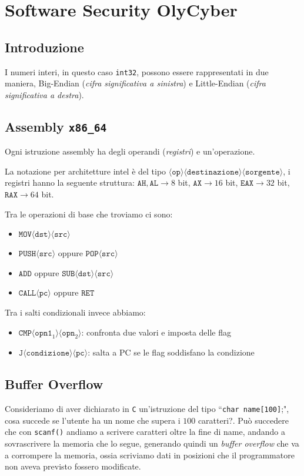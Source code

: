 \chapter{Software Security OlyCyber}
\section{Introduzione}
I numeri interi, in questo caso \texttt{int32}, possono essere rappresentati
in due maniera, Big-Endian (\textit{cifra significativa a sinistra}) e
Little-Endian (\textit{cifra significativa a destra}).
\section{Assembly \texttt{x86\_64}}
Ogni istruzione assembly ha degli operandi (\textit{registri}) e un'operazione.

La notazione per architetture intel è del tipo  $\langle \texttt{op} \rangle
\langle \texttt{destinazione} \rangle \langle \texttt{sorgente} \rangle$,
i registri hanno la seguente struttura:
$\texttt{AH},\texttt{AL} \rightarrow 8$ bit,
$\texttt{AX} \rightarrow 16$ bit,
$\texttt{EAX} \rightarrow 32$ bit,
$\texttt{RAX} \rightarrow 64$ bit.

Tra le operazioni di base che troviamo ci sono: 
\begin{itemize}
    \item $\texttt{MOV} \langle \texttt{dst}\rangle\langle \texttt{src}\rangle$
    \item $\texttt{PUSH} \langle \texttt{src}\rangle$ oppure $\texttt{POP}\langle \texttt{src}\rangle$
    \item $\texttt{ADD}$ oppure $\texttt{SUB} \langle \texttt{dst}\rangle\langle \texttt{src}\rangle$
    \item $\texttt{CALL} \langle \texttt{pc}\rangle$ oppure $\texttt{RET}$
\end{itemize}
Tra i salti condizionali invece abbiamo:
\begin{itemize}
    \item $\texttt{CMP} \langle \texttt{opn1}_1\rangle\langle \texttt{opn}_2\rangle$: confronta due valori e imposta delle flag
    \item $\texttt{J} \langle \texttt{condizione}\rangle\langle \texttt{pc}\rangle$: salta a PC se le flag soddisfano la condizione
\end{itemize}
\section{Buffer Overflow}
Consideriamo di aver dichiarato in \texttt{C} un'istruzione del tipo ``\texttt{char name[100]};",
cosa succede se l'utente ha un nome che supera i $100$ caratteri?.
Può succedere che con \texttt{scanf()} andiamo a scrivere caratteri oltre la fine di name,
andando a sovrascrivere la memoria che lo segue, generando quindi un \textit{buffer overflow}
che va a corrompere la memoria, ossia scriviamo dati in posizioni che il programmatore non
aveva previsto fossero modificate.

